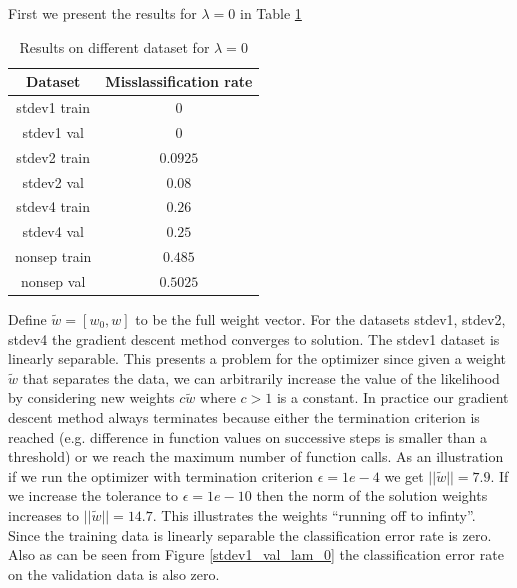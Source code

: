 \documentclass[10pt]{article}
\begin{document}
First we present the results for $\lambda = 0$ in Table \ref{lam_0}
\begin{table}[H]
\begin{tabular}{|c|c|}
\hline
\textbf{Dataset} & \textbf{Misslassification rate} \\ \hline
stdev1 train & $0$\\ \hline
stdev1 val & $0$\\ \hline
stdev2 train & $0.0925$\\ \hline
stdev2 val & $0.08$\\ \hline
stdev4 train & $0.26$\\ \hline
stdev4 val & $0.25$\\ \hline
nonsep train & $0.485$\\ \hline
nonsep val & $0.5025$\\ \hline
\end{tabular}

\caption{Results on different dataset for $\lambda = 0$}
\label{lam_0}
\end{table}


 Define $\tilde{w} = [w_0,w]$ to be the full weight vector. For the datasets stdev1, stdev2, stdev4 the gradient descent method converges to solution. The stdev1 dataset is linearly separable. This presents a problem for the optimizer since given a weight $\tilde{w}$ that separates the data, we can arbitrarily increase the value of the likelihood by considering new weights $c \tilde{w}$ where $c > 1$ is a constant. In practice our gradient descent method always terminates because either the termination criterion is reached (e.g. difference in function values on successive steps is smaller than a threshold) or we reach the maximum number of function calls. As an illustration if we run the optimizer with termination criterion $\epsilon = 1e-4$ we get $||\tilde{w}|| = 7.9$. If we increase the tolerance to $\epsilon = 1e-10$ then the norm of the solution weights increases to $||\tilde{w}|| = 14.7$. This illustrates the weights ``running off to infinty''. Since the training data is linearly separable the classification error rate is zero. Also as can be seen from Figure \ref{stdev1_val_lam_0} the classification error rate on the validation data is also zero.

\end{document}
